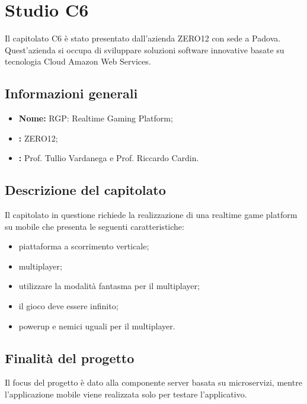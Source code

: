 \section{Studio C6} \label{_c6}
Il capitolato C6 è stato presentato dall'azienda ZERO12 con sede a Padova. Quest'azienda si occupa di sviluppare soluzioni software
innovative basate su tecnologia Cloud Amazon Web Services.

\subsection{Informazioni generali}
\begin{itemize}
	\item \textbf{Nome:} RGP: Realtime Gaming Platform;
	\item \textbf{:} ZERO12;
	\item \textbf{:} Prof. Tullio Vardanega e Prof. Riccardo Cardin.
\end{itemize}

\subsection{Descrizione del capitolato}
Il capitolato in questione richiede la realizzazione di una realtime game platform su mobile che presenta le seguenti caratteristiche:
\begin{itemize}
	\item piattaforma a scorrimento verticale;
	\item multiplayer;
	\item utilizzare la modalità fantasma per il multiplayer;
	\item il gioco deve essere infinito;
	\item powerup e nemici uguali per il multiplayer.
\end{itemize}


\subsection{Finalità del progetto}
Il focus del progetto è dato alla componente server basata su microservizi, mentre l'applicazione mobile viene realizzata solo per testare l'applicativo.

